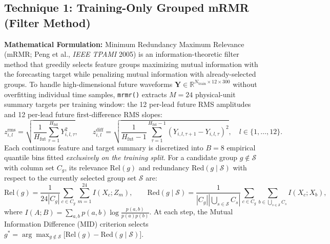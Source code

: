 \documentclass[11pt,a4paper]{article}
\begin{document}
\subsection{Technique 1: Training-Only Grouped mRMR (Filter Method)}
\textbf{Mathematical Formulation:} Minimum Redundancy Maximum Relevance (mRMR; Peng et al., \emph{IEEE TPAMI} 2005) is an information-theoretic filter method that greedily selects feature groups maximizing mutual information with the forecasting target while penalizing mutual information with already-selected groups. To handle high-dimensional future waveforms $\mathbf{Y} \in \mathbb{R}^{N_{\text{train}} \times 12 \times 300}$ without overfitting individual time samples, \texttt{mrmr()} extracts $M = 24$ physical-unit summary targets per training window: the 12 per-lead future RMS amplitudes and 12 per-lead future first-difference RMS slopes:
\begin{equation}
    z_{i,l}^{\text{rms}} = \sqrt{\frac{1}{H_{\text{fut}}} \sum_{\tau=1}^{H_{\text{fut}}} Y_{i,l,\tau}^2}, \qquad
    z_{i,l}^{\text{diff}} = \sqrt{\frac{1}{H_{\text{fut}}-1} \sum_{\tau=1}^{H_{\text{fut}}-1} (Y_{i,l,\tau+1} - Y_{i,l,\tau})^2}, \quad l \in \{1,\dots,12\}.
\end{equation}
Each continuous feature and target summary is discretized into $B = 8$ empirical quantile bins fitted \emph{exclusively on the training split}. For a candidate group $g \notin \mathcal{S}$ with column set $C_g$, its relevance $\text{Rel}(g)$ and redundancy $\text{Red}(g \mid \mathcal{S})$ with respect to the currently selected group set $\mathcal{S}$ are:
\begin{equation}
    \text{Rel}(g) = \frac{1}{24 |C_g|} \sum_{c \in C_g} \sum_{m=1}^{24} I(X_c; Z_m), \qquad
    \text{Red}(g \mid \mathcal{S}) = \frac{1}{|C_g| |\bigcup_{s \in \mathcal{S}} C_s|} \sum_{c \in C_g} \sum_{b \in \bigcup_{s \in \mathcal{S}} C_s} I(X_c; X_b),
\end{equation}
where $I(A; B) = \sum_{a,b} p(a,b) \log \frac{p(a,b)}{p(a)p(b)}$. At each step, the Mutual Information Difference (MID) criterion selects $g^* = \arg\max_{g \notin \mathcal{S}} \big[\text{Rel}(g) - \text{Red}(g \mid \mathcal{S})\big]$.
\end{document}
